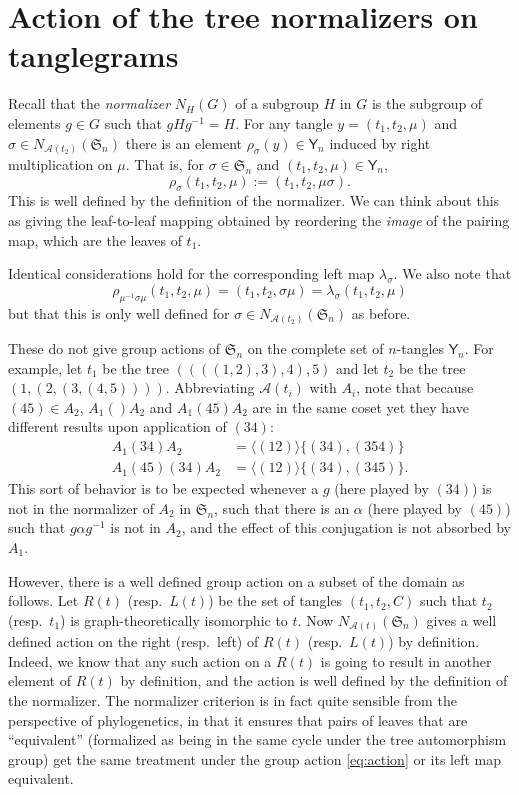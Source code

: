\documentclass{amsart}
\newcommand{\fS}{\mathfrak S}
\newcommand{\aut}{\mathcal A}
\newcommand{\pairing}{\mu}
\newcommand{\tangle}{\mathsf{Y}}
\newcommand{\id}{()}
\begin{document}
\section{Action of the tree normalizers on tanglegrams}
Recall that the \emph{normalizer} $N_H(G)$ of a subgroup $H$ in $G$ is the subgroup of elements $g \in G$ such that $gHg^{-1} = H$.
For any tangle $y = (t_1, t_2, \pairing)$ and $\sigma \in N_{\aut(t_2)}(\fS_n)$ there is an element $\rho_\sigma(y) \in \tangle_n$ induced by right multiplication on $\pairing$.
That is, for $\sigma \in \fS_n$ and $(t_1, t_2, \pairing) \in \tangle_n$,
\begin{equation}
\label{eq:action}
\rho_\sigma (t_1, t_2, \pairing) := (t_1, t_2, \pairing \sigma).
\end{equation}
This is well defined by the definition of the normalizer.
We can think about this as giving the leaf-to-leaf mapping obtained by reordering the \emph{image} of the pairing map, which are the leaves of $t_1$.

Identical considerations hold for the corresponding left map $\lambda_\sigma$.
We also note that
\[
\rho_{\pairing^{-1} \sigma \pairing} (t_1, t_2, \pairing) =
(t_1, t_2, \sigma \pairing) =
\lambda_{\sigma} (t_1, t_2, \pairing)
\]
but that this is only well defined for $\sigma \in N_{\aut(t_2)}(\fS_n)$ as before.

These do not give group actions of $\fS_n$ on the complete set of $n$-tangles $\tangle_n$.
For example, let $t_1$ be the tree $((((1,2),3),4),5)$ and let $t_2$ be the tree $(1,(2,(3,(4,5))))$.
Abbreviating $\aut(t_i)$ with $A_i$, note that because $(4 5) \in A_2$, $A_1 \id A_2$ and $A_1 (4 5) A_2$ are in the same coset yet they have different results upon application of $(3 4)$:
\begin{align*}
A_1 (3 4) A_2 & = \langle (1 2) \rangle \{(3 4), (3 5 4)\} \\
A_1 (4 5) (3 4) A_2 & = \langle (1 2) \rangle \{(3 4), (3 4 5)\}.
\end{align*}
This sort of behavior is to be expected whenever a $g$ (here played by $(3 4)$) is not in the normalizer of $A_2$ in $\fS_n$, such that there is an $\alpha$ (here played by $(4 5)$) such that $g \alpha g^{-1}$ is not in $A_2$, and the effect of this conjugation is not absorbed by $A_1$.

However, there is a well defined group action on a subset of the domain as follows.
Let $R(t)$ (resp.\ $L(t)$) be the set of tangles $(t_1, t_2, C)$ such that $t_2$ (resp.\ $t_1$) is graph-theoretically isomorphic to $t$.
Now $N_{\aut(t)}(\fS_n)$ gives a well defined action on the right (resp.\ left) of $R(t)$ (resp.\ $L(t)$) by definition.
Indeed, we know that any such action on a $R(t)$ is going to result in another element of $R(t)$ by definition, and the action is well defined by the definition of the normalizer.
The normalizer criterion is in fact quite sensible from the perspective of phylogenetics, in that it ensures that pairs of leaves that are ``equivalent'' (formalized as being in the same cycle under the tree automorphism group) get the same treatment under the group action \eqref{eq:action} or its left map equivalent.
\end{document}
